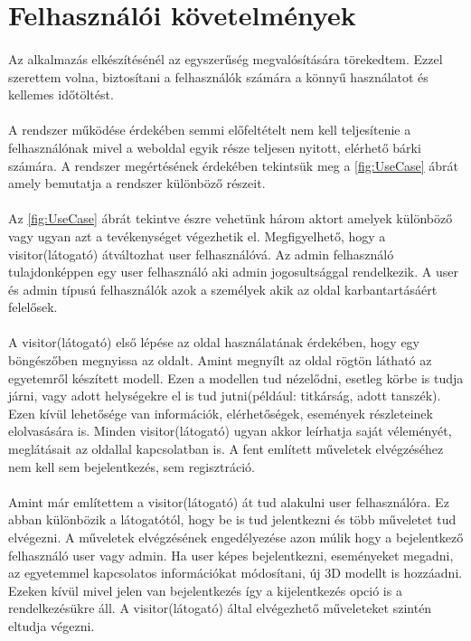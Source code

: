 \section{Felhasználói követelmények}
	\paragraph{}
	Az alkalmazás elkészítésénél az egyszerűség megvalósítására törekedtem. Ezzel szerettem volna, biztosítani a felhasználók számára a könnyű használatot és kellemes időtöltést. 
	\paragraph{}
	A rendszer működése érdekében semmi előfeltételt nem kell teljesítenie a felhasználónak mivel a weboldal egyik része teljesen nyitott, elérhető bárki számára. A rendszer megértésének érdekében tekintsük meg a \ref{fig:UseCase} ábrát amely bemutatja a rendszer különböző részeit.
	\paragraph{}
	Az \ref{fig:UseCase} ábrát tekintve észre vehetünk három aktort amelyek különböző vagy ugyan azt a tevékenységet végezhetik el. Megfigyelhető, hogy a visitor(látogató) átváltozhat user felhasználóvá. Az admin felhasználó tulajdonképpen egy user felhasználó aki admin jogosultsággal rendelkezik. A user és admin típusú felhasználók azok a személyek akik az oldal karbantartásáért felelősek.
	\paragraph{}
	A visitor(látogató) első lépése az oldal használatának érdekében, hogy egy böngészőben megnyissa az oldalt. Amint megnyílt az oldal rögtön látható az egyetemről készített modell. Ezen a modellen tud nézelődni, esetleg körbe is tudja járni, vagy adott helységekre el is tud jutni(például: titkárság, adott tanszék). Ezen kívül lehetősége van információk, elérhetőségek, események részleteinek elolvasására is. Minden visitor(látogató) ugyan akkor leírhatja saját véleményét, meglátásait az oldallal kapcsolatban is. A fent említett műveletek elvégzéséhez nem kell sem bejelentkezés, sem regisztráció.
	\paragraph{}
	Amint már említettem a visitor(látogató) át tud alakulni user felhasználóra. Ez abban különbözik a látogatótól, hogy be is tud jelentkezni és több műveletet tud elvégezni. A műveletek elvégzésének engedélyezése azon múlik hogy a bejelentkező felhasználó user vagy admin. Ha user képes bejelentkezni, eseményeket megadni, az egyetemmel kapcsolatos információkat módosítani, új 3D modellt is hozzáadni. Ezeken kívül mivel jelen van bejelentkezés így a kijelentkezés opció is a rendelkezésükre áll. A visitor(látogató) által elvégezhető műveleteket szintén eltudja végezni.

